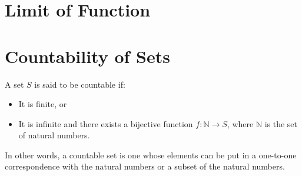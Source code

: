 \section{Limit of Function}



\section{Countability of Sets}
\begin{definition}
A set $S$ is said to be countable if:
\begin{itemize}
    \item It is finite, or
    \item It is infinite and there exists a bijective function $f: \mathbb{N} \rightarrow S$, where $\mathbb{N}$ is the set of natural numbers.
\end{itemize}
In other words, a countable set is one whose elements can be put in a one-to-one correspondence with the natural numbers or a subset of the natural numbers.
\end{definition}



